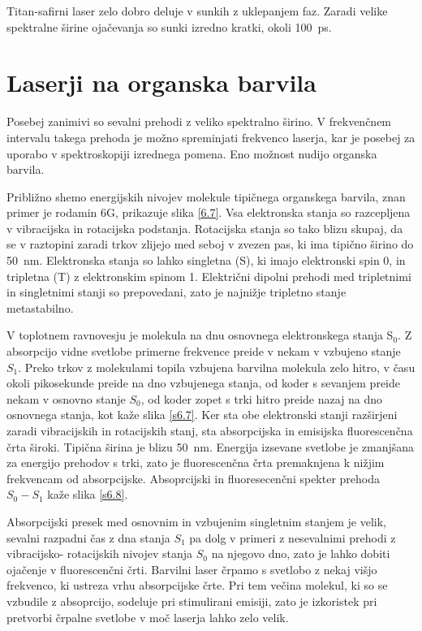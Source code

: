 Titan-safirni laser zelo dobro deluje v sunkih z uklepanjem faz. Zaradi
velike spektralne širine ojačevanja so sunki izredno kratki, okoli 100~ps.


\section{Laserji na organska barvila}

Posebej zanimivi so sevalni prehodi z veliko spektralno širino. V
frekvenčnem intervalu takega prehoda je možno spreminjati frekvenco
laserja, kar je posebej za uporabo v spektroskopiji izrednega pomena. Eno
možnost nudijo organska barvila.

Približno shemo energijskih nivojev molekule tipičnega organskega barvila,
znan primer je rodamin 6G, prikazuje slika \ref{6.7}. Vsa elektronska stanja
so razcepljena v vibracijska in rotacijska podstanja. Rotacijska stanja so
tako blizu skupaj, da se v raztopini zaradi trkov zlijejo med seboj v zvezen
pas, ki ima tipično širino do 50~nm. Elektronska stanja so lahko singletna
(S), ki imajo elektronski spin 0, in tripletna (T) z elektronskim spinom 1.
Električni dipolni prehodi med tripletnimi in singletnimi stanji so
prepovedani, zato je najnižje tripletno stanje metastabilno.

V toplotnem ravnovesju je molekula na dnu osnovnega elektronskega stanja S$_0
$. Z absorpcijo vidne svetlobe primerne frekvence preide v nekam v vzbujeno
stanje $S_1$. Preko trkov z molekulami topila vzbujena barvilna molekula
zelo hitro, v času okoli pikosekunde preide na dno vzbujenega stanja, od
koder s sevanjem preide nekam v osnovno stanje $S_0$, od koder zopet s trki
hitro preide nazaj na dno osnovnega stanja, kot kaže slika \ref{s6.7}. Ker
sta obe elektronski stanji razširjeni zaradi vibracijskih in rotacijskih
stanj, sta absorpcijska in emisijska fluorescenčna črta široki. Tipična
širina je blizu 50~nm. Energija izsevane svetlobe je zmanjšana za energijo
prehodov s trki, zato je fluorescenčna črta premaknjena k nižjim
frekvencam od absorpcijske. Absoprcijski in fluoresecenčni spekter prehoda $%
S_0-S_1$ kaže slika \ref{s6.8}.

Absorpcijski presek med osnovnim in vzbujenim singletnim stanjem je velik,
sevalni razpadni čas z dna stanja $S_1$ pa dolg v primeri z nesevalnimi
prehodi z vibracijsko- rotacijskih nivojev stanja $S_0$ na njegovo dno, zato
je lahko dobiti ojačenje v fluorescenčni črti. Barvilni laser črpamo s
svetlobo z nekaj višjo frekvenco, ki ustreza vrhu absorpcijske črte. Pri
tem večina molekul, ki so se vzbudile z absoprcijo, sodeluje pri
stimulirani emisiji, zato je izkoristek pri pretvorbi črpalne svetlobe v
moč laserja lahko zelo velik.

